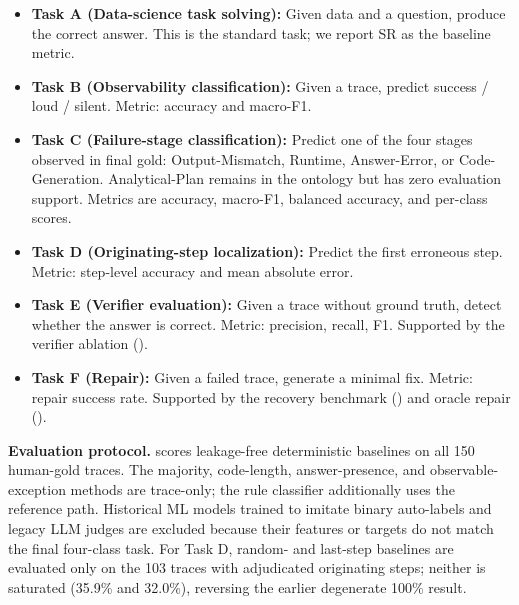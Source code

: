 \begin{itemize}[leftmargin=*,itemsep=1pt]
\item \textbf{Task A (Data-science task solving):} Given data and a question, produce the correct answer. This is the standard task; we report SR as the baseline metric.
\item \textbf{Task B (Observability classification):} Given a trace, predict success / loud / silent. Metric: accuracy and macro-F1.
\item \textbf{Task C (Failure-stage classification):} Predict one of the four stages observed in final gold: Output-Mismatch, Runtime, Answer-Error, or Code-Generation. Analytical-Plan remains in the ontology but has zero evaluation support. Metrics are accuracy, macro-F1, balanced accuracy, and per-class scores.
\item \textbf{Task D (Originating-step localization):} Predict the first erroneous step. Metric: step-level accuracy and mean absolute error.
\item \textbf{Task E (Verifier evaluation):} Given a trace without ground truth, detect whether the answer is correct. Metric: precision, recall, F1. Supported by the verifier ablation ().
\item \textbf{Task F (Repair):} Given a failed trace, generate a minimal fix. Metric: repair success rate. Supported by the recovery benchmark () and oracle repair ().
\end{itemize}

\textbf{Evaluation protocol.}  scores leakage-free deterministic baselines on all 150 human-gold traces. The majority, code-length, answer-presence, and observable-exception methods are trace-only; the rule classifier additionally uses the reference path. Historical ML models trained to imitate binary auto-labels and legacy LLM judges are excluded because their features or targets do not match the final four-class task. For Task D, random- and last-step baselines are evaluated only on the 103 traces with adjudicated originating steps; neither is saturated (35.9\% and 32.0\%), reversing the earlier degenerate 100\% result.



\FloatBarrier
